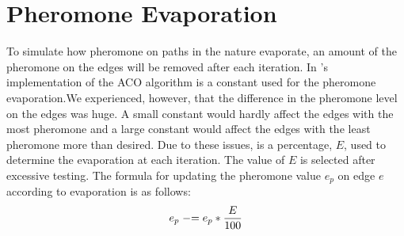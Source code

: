 \section{Pheromone Evaporation}
\label{sec:evaporation}
To simulate how pheromone on paths in the nature evaporate, an amount of the pheromone on the edges will be removed after each iteration. In \citet{nanda11}'s implementation of the ACO algorithm is a constant used for the pheromone evaporation.We experienced, however, that the difference in the pheromone level on the edges was huge. A small constant would hardly affect the edges with the most pheromone and a large constant would affect the edges with the least pheromone more than desired. Due to these issues, is a percentage, $E$, used to determine the evaporation at each iteration. The value of $E$ is selected after excessive testing.
The formula for updating the pheromone value $e_p$ on edge $e$ according to evaporation is as follows: 
\newline
$$e_p \mathrel{-}= e_p*\frac{E}{100}$$
\newline


